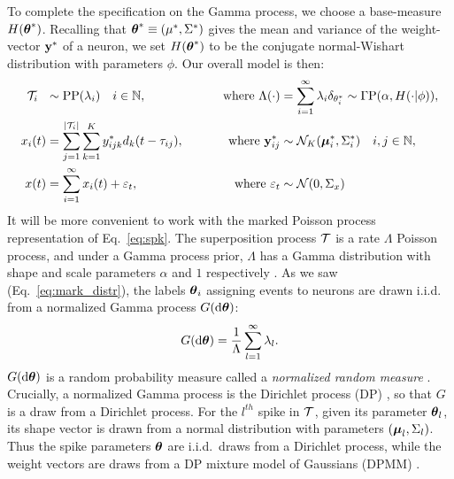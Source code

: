 To complete the specification on the Gamma process, we choose a base-measure $H(\boldsymbol{\theta}^*)$.
Recalling that $\boldsymbol{\theta}^* \equiv (\mu^*, \Sigma^*)$ gives the mean and variance of the weight-vector $\mathbf{y}^*$ of a neuron, we set $H(\boldsymbol{\theta}^*)$ 
to be the conjugate normal-Wishart distribution with parameters $\phi$. Our overall model is then:
\vspace{-.1in}
\begin{subequations}
\begin{align}
  \mc{T}_i\ \  &\sim \text{PP}(\lambda_i) \quad i \in \NN, \qquad &\text{ where } \Lambda(\cdot)&=\sum_{i=1}^{\infty} \lambda_i \delta_{\theta^*_i} \sim \Gamma \text{P}(\alpha, H(\cdot| {\phi})), \\ %
  x_i(t) &= \sum_{j = 1}^{|\mc{T}_i|}  \sum_{k = 1}^{K} y^*_{ijk} d_k(t - \tau_{ij}), \qquad &\text{ where }\by^*_{ij}  &\sim \mc{N}_K(\mb{\mu}^*_i, \Sigma^*_i) \quad i,j \in \NN, \\
  x(t)   &= \sum_{i=1}^{\infty} x_i(t) + \eps_t, \qquad &\text{ where } \eps_t &\sim \mc{N}(0,\Sigma_x)
\end{align}
\end{subequations}
% 
It will be more convenient to work with the marked Poisson process representation of Eq.~\eqref{eq:spk}. %
The superposition process $\mathcal{T}$ is a rate $\Lambda$ Poisson process,
and under a Gamma process prior, $\Lambda$ has a Gamma distribution with shape and scale parameters $\alpha$ and $1$ respectively \citep{Ferguson73}.
As we saw (Eq.~\eqref{eq:mark_distr}), the labels $\boldsymbol{\theta}_i$ assigning events to neurons are drawn i.i.d. from a normalized Gamma 
process $G(\mathrm{d} \boldsymbol{\theta})$:
\vspace{-.2in}
\begin{align}
 G(\mathrm{d} \boldsymbol{\theta}) = \frac{1}{\Lambda} \sum_{l=1}^{\infty} \lambda_l.
\end{align}
$G(\mathrm{d} \boldsymbol{\theta})$ is a random probability measure called a \emph{normalized random measure} \citep{JamesLP09}. Crucially, a 
normalized Gamma process is the Dirichlet process (DP) \citep{Ferguson73}, so that $G$ is a draw from a Dirichlet process. For the $l^{th}$ spike in $\mathcal{T}$, given its 
parameter $\boldsymbol{\theta}_l$, its shape vector is drawn from a normal distribution
with parameters $(\boldsymbol{\mu}_{l}, \Sigma_{l})$. Thus the spike parameters $\boldsymbol{\theta}$ are i.i.d.\ draws from a Dirichlet process, while the weight vectors are
draws from a DP mixture model of Gaussians (DPMM) \citep{Lo1984}.

